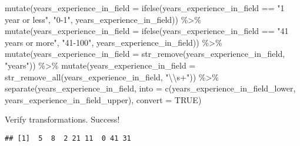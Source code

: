 \documentclass[
]{article}
\newenvironment{Shaded}{\begin{snugshade}}{\end{snugshade}}
\newcommand{\AttributeTok}[1]{\textcolor[rgb]{0.77,0.63,0.00}{#1}}
\newcommand{\ConstantTok}[1]{\textcolor[rgb]{0.00,0.00,0.00}{#1}}
\newcommand{\FunctionTok}[1]{\textcolor[rgb]{0.00,0.00,0.00}{#1}}
\newcommand{\NormalTok}[1]{#1}
\newcommand{\SpecialCharTok}[1]{\textcolor[rgb]{0.00,0.00,0.00}{#1}}
\newcommand{\StringTok}[1]{\textcolor[rgb]{0.31,0.60,0.02}{#1}}
\begin{document}
\begin{Shaded}
\begin{Highlighting}[]
        \FunctionTok{mutate}\NormalTok{(}\AttributeTok{years\_experience\_in\_field =} 
                   \FunctionTok{ifelse}\NormalTok{(years\_experience\_in\_field }\SpecialCharTok{==} \StringTok{"1 year or less"}\NormalTok{, }\StringTok{"0{-}1"}\NormalTok{, years\_experience\_in\_field)) }\SpecialCharTok{\%\textgreater{}\%}
        \FunctionTok{mutate}\NormalTok{(}\AttributeTok{years\_experience\_in\_field =} 
                   \FunctionTok{ifelse}\NormalTok{(years\_experience\_in\_field }\SpecialCharTok{==} \StringTok{"41 years or more"}\NormalTok{, }\StringTok{"41{-}100"}\NormalTok{, years\_experience\_in\_field)) }\SpecialCharTok{\%\textgreater{}\%}
        \FunctionTok{mutate}\NormalTok{(}\AttributeTok{years\_experience\_in\_field =} \FunctionTok{str\_remove}\NormalTok{(years\_experience\_in\_field, }\StringTok{"years"}\NormalTok{)) }\SpecialCharTok{\%\textgreater{}\%}
        \FunctionTok{mutate}\NormalTok{(}\AttributeTok{years\_experience\_in\_field =} \FunctionTok{str\_remove\_all}\NormalTok{(years\_experience\_in\_field, }\StringTok{"}\SpecialCharTok{\textbackslash{}\textbackslash{}}\StringTok{s+"}\NormalTok{)) }\SpecialCharTok{\%\textgreater{}\%}
        \FunctionTok{separate}\NormalTok{(years\_experience\_in\_field, }\AttributeTok{into =} \FunctionTok{c}\NormalTok{(}\StringTok{\textquotesingle{}years\_experience\_in\_field\_lower\textquotesingle{}}\NormalTok{, }\StringTok{\textquotesingle{}years\_experience\_in\_field\_upper\textquotesingle{}}\NormalTok{), }\AttributeTok{convert =} \ConstantTok{TRUE}\NormalTok{)}
\end{Highlighting}
\end{Shaded}

Verify transformations. Success!

\begin{Shaded}
\end{Shaded}

\begin{verbatim}
## [1]  5  8  2 21 11  0 41 31
\end{verbatim}

\begin{Shaded}
\end{Shaded}
\end{document}
